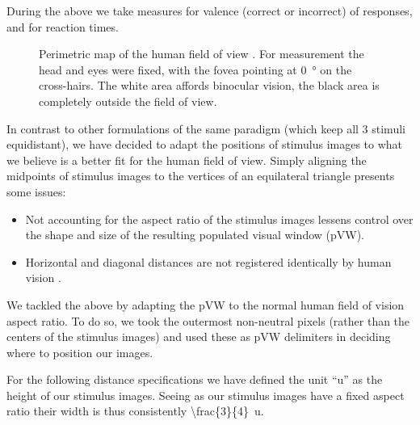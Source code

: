 	    During the above we take measures for valence (correct or incorrect) of responses, and for reaction times.
	    
	    \begin{wrapfigure}{r}{0.45\textwidth}
		\centering
		\vspace{-1.0cm}
		\caption{Perimetric map of the human field of view \citep{Ruch1960}.
		For measurement the head and eyes were fixed, with the fovea pointing at \SI{0}{\degree} on the cross-hairs.
		The white area affords binocular vision, the black area is completely outside the field of view.}
		\label{fig:m_b_1}
		\vspace{-1.0cm}
	    \end{wrapfigure}
	    
	    In contrast to other formulations\citep{Hariri2000,Hariri2003} of the same paradigm (which keep all 3 stimuli equidistant),
	    we have decided to adapt the positions of stimulus images to what we believe is a better fit for the human field of view.
	    Simply aligning the midpoints of stimulus images to the vertices of an equilateral triangle presents some issues:
	    \begin{itemize}
		\item Not accounting for the aspect ratio of the stimulus images lessens control over the shape and size of the resulting populated visual window (pVW).
		\item Horizontal and diagonal distances are not registered identically by human vision \citep{TerryBahill1975}.
	    \end{itemize}
	    
	    We tackled the above by adapting the pVW to the normal human field of vision aspect ratio.
	    To do so, we took the outermost non-neutral pixels (rather than the centers of the stimulus images) and used these as pVW delimiters in deciding where to position our images.
	    
	    For the following distance specifications we have defined the unit “u” as the height of our stimulus images.
	    Seeing as our stimulus images have a fixed aspect ratio their width is thus consistently \SI[parse-numbers = false]{\frac{3}{4}}{u}.
	    
